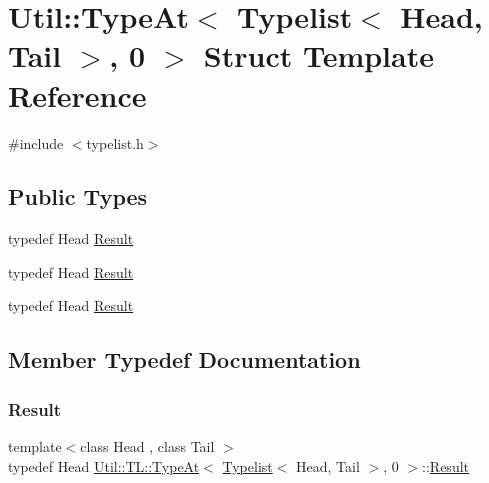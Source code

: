 \hypertarget{structUtil_1_1TL_1_1TypeAt_3_01Typelist_3_01Head_00_01Tail_01_4_00_010_01_4}{}\section{Util\+:\+:Type\+At$<$ Typelist$<$ Head, Tail $>$, 0 $>$ Struct Template Reference}
\label{structUtil_1_1TL_1_1TypeAt_3_01Typelist_3_01Head_00_01Tail_01_4_00_010_01_4}


{\ttfamily \#include $<$typelist.\+h$>$}

\subsection*{Public Types}
\begin{DoxyCompactItemize}
\item 
typedef Head \mbox{\hyperlink{structUtil_1_1TL_1_1TypeAt_3_01Typelist_3_01Head_00_01Tail_01_4_00_010_01_4_a3e1d7aaa0069c4e96cbb6bbc823fa9e8}{Result}}
\item 
typedef Head \mbox{\hyperlink{structUtil_1_1TL_1_1TypeAt_3_01Typelist_3_01Head_00_01Tail_01_4_00_010_01_4_a3e1d7aaa0069c4e96cbb6bbc823fa9e8}{Result}}
\item 
typedef Head \mbox{\hyperlink{structUtil_1_1TL_1_1TypeAt_3_01Typelist_3_01Head_00_01Tail_01_4_00_010_01_4_a3e1d7aaa0069c4e96cbb6bbc823fa9e8}{Result}}
\end{DoxyCompactItemize}


\subsection{Member Typedef Documentation}
\mbox{\label{structUtil_1_1TL_1_1TypeAt_3_01Typelist_3_01Head_00_01Tail_01_4_00_010_01_4_a3e1d7aaa0069c4e96cbb6bbc823fa9e8}} 
\subsubsection{\texorpdfstring{Result}{Result}\hspace{0.1cm}{\footnotesize\ttfamily [1/3]}}
{\footnotesize\ttfamily template$<$class Head , class Tail $>$ \\
typedef Head \mbox{\hyperlink{structUtil_1_1TL_1_1TypeAt}{Util\+::\+T\+L\+::\+Type\+At}}$<$ \mbox{\hyperlink{structUtil_1_1Typelist}{Typelist}}$<$ Head, Tail $>$, 0 $>$\+::\mbox{\hyperlink{structUtil_1_1TL_1_1TypeAt_3_01Typelist_3_01Head_00_01Tail_01_4_00_010_01_4_a3e1d7aaa0069c4e96cbb6bbc823fa9e8}{Result}}}

